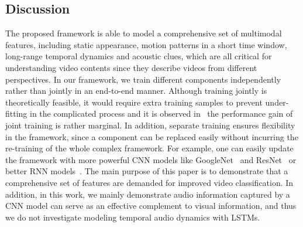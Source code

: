 \documentclass[journal]{IEEEtran}
\begin{document}
\subsection{Discussion}
The proposed framework is able to model a comprehensive set of multimodal features, including static appearance, motion patterns in a short time window, long-range temporal dynamics and acoustic clues, which are all critical for understanding video contents since they describe videos from different perspectives. In our framework, we train different components independently rather than jointly in an end-to-end manner. Although training jointly is theoretically feasible, it would require extra training samples to prevent under-fitting in the complicated process and it is observed in~\cite{Donahue2015} the performance gain of joint training is rather marginal. In addition, separate training ensures flexibility in the framework, since a component can be replaced easily without incurring the re-training of the whole complex framework. For example, one can easily update the framework with more powerful CNN models like GoogleNet~\cite{Szegedy2015} and ResNet~\cite{He2016a} or better RNN models~\cite{DBLP:journals/corr/ChungGCB15}. The main purpose of this paper is to demonstrate that a comprehensive set of features are demanded for improved video classification. In addition, in this work, we mainly demonstrate audio information captured by a CNN model can serve as an effective complement to visual information, and thus we do not investigate modeling temporal audio dynamics with LSTMs.


\end{document}
